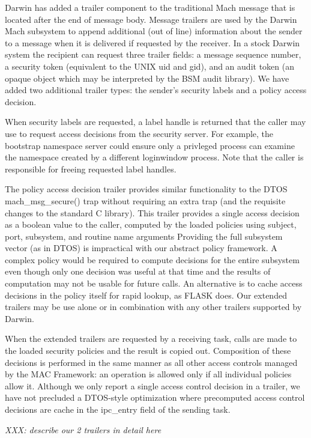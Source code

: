 Darwin has added a trailer component to the traditional Mach message
that is located after the end of message body.  Message trailers
are used by the Darwin Mach subsystem to append additional (out of
line) information about the sender to a message when it is delivered
if requested by the receiver.  In a stock Darwin system the recipient
can request three trailer fields: a message sequence number, a
security token (equivalent to the UNIX uid and gid), and an audit
token (an opaque object which may be interpreted by the BSM audit
library).  We have added two additional trailer types: the sender's
security labels and a policy access decision.

When security labels are requested, a label handle is returned that
the caller may use to request access decisions from the security
server.  For example, the bootstrap namespace server could ensure only a
privleged process can examine the namespace created by a different
loginwindow process.  Note that the caller is responsible for freeing
requested label handles.

The policy access decision trailer provides similar functionality
to the DTOS mach\_msg\_secure() trap without requiring an extra trap
(and the requisite changes to the standard C library).
This trailer provides a single access decision as a boolean value
to the caller, computed by the loaded policies using subject, port,
subsystem, and routine name arguments  Providing the full subsystem
vector (as in DTOS) is impractical with our abstract policy framework.
A complex policy would be required to compute decisions for the
entire subsystem even though only one decision was useful at that
time and the results of computation may not be usable for future
calls.  An alternative is to cache access decisions in the policy
itself for rapid lookup, as FLASK does.  Our extended trailers may
be use alone or in combination with any other trailers supported
by Darwin.

When the extended trailers are requested by a receiving task, calls
are made to the loaded security policies and the result is copied
out. Composition of these decisions is performed in the same manner
as all other access controls managed by the MAC Framework: an
operation is allowed only if all individual policies allow it.
Although we only report a single access control decision in a
trailer, we have not precluded a DTOS-style optimization where
precomputed access control decisions are cache in the ipc\_entry
field of the sending task.

\textit{XXX: describe our 2 trailers in detail here}


